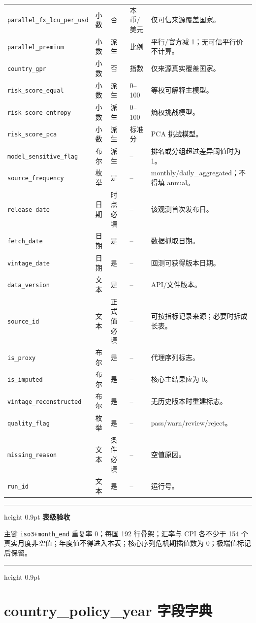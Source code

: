 \documentclass[UTF8,fontset=windows,12pt,openany]{ctexbook}
\newenvironment{gatebox}[1][]{%
  \par\medskip\noindent\begin{center}\begin{minipage}{0.93\textwidth}%
  \color{GoldLine}\hrule height 0.9pt\vspace{0.45em}%
  \textbf{#1}\par\smallskip\color{black}%
}{%
  \par\vspace{0.35em}\color{GoldLine}\hrule height 0.9pt%
  \end{minipage}\end{center}\medskip%
}
\newcommand{\Field}[1]{{\small\nolinkurl{#1}}}
\begin{document}
\begin{landscape}
\begin{longtable}{p{4.0cm}p{2.3cm}p{2.3cm}p{2.7cm}p{7.2cm}}
\Field{parallel_fx_lcu_per_usd} & 小数 & 否 & 本币/美元 & 仅可信来源覆盖国家。\\
\Field{parallel_premium} & 小数 & 派生 & 比例 & 平行/官方减 1；无可信平行价不计算。\\
\Field{country_gpr} & 小数 & 否 & 指数 & 仅来源真实覆盖国家。\\
\Field{risk_score_equal} & 小数 & 派生 & 0--100 & 等权可解释主模型。\\
\Field{risk_score_entropy} & 小数 & 派生 & 0--100 & 熵权挑战模型。\\
\Field{risk_score_pca} & 小数 & 派生 & 标准分 & PCA 挑战模型。\\
\Field{model_sensitive_flag} & 布尔 & 派生 & -- & 排名或分组超过差异阈值时为 1。\\
\Field{source_frequency} & 枚举 & 是 & -- & monthly/daily\_aggregated；不得填 annual。\\
\Field{release_date} & 日期 & 时点必填 & -- & 该观测首次发布日。\\
\Field{fetch_date} & 日期 & 是 & -- & 数据抓取日期。\\
\Field{vintage_date} & 日期 & 是 & -- & 回测可获得版本日期。\\
\Field{data_version} & 文本 & 是 & -- & API/文件版本。\\
\Field{source_id} & 文本 & 正式值必填 & -- & 可按指标记录来源；必要时拆成长表。\\
\Field{is_proxy} & 布尔 & 是 & -- & 代理序列标志。\\
\Field{is_imputed} & 布尔 & 是 & -- & 核心主结果应为 0。\\
\Field{vintage_reconstructed} & 布尔 & 是 & -- & 无历史版本时重建标志。\\
\Field{quality_flag} & 枚举 & 是 & -- & pass/warn/review/reject。\\
\Field{missing_reason} & 文本 & 条件必填 & -- & 空值原因。\\
\Field{run_id} & 文本 & 是 & -- & 运行号。\\
\bottomrule
\end{longtable}
\end{landscape}

\begin{gatebox}[表级验收]
主键 \Field{iso3+month_end} 重复率 0；每国 192 行骨架；汇率与 CPI 各不少于 154 个真实月度非空值；年度值不得进入本表；核心序列危机期插值数为 0；极端值标记后保留。
\end{gatebox}

\chapter{country\_policy\_year 字段字典}
\end{document}
